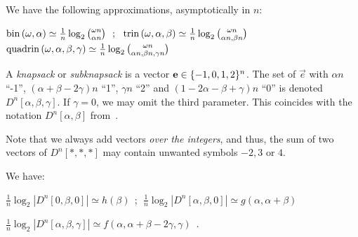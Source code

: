 \begin{property}%
 We have the following approximations, asymptotically in $n$:
\begin{center}$\mathrm{bin}\left(\omega,\alpha\right) \simeq \frac{1}{n} \log_2{\omega n \choose \alpha n} ~~;~~ \mathrm{trin}\left(\omega,\alpha,\beta\right) \simeq \frac{1}{n} \log_2{\omega n \choose \alpha n, \beta n} $ $ \mathrm{quadrin}\left(\omega,\alpha,\beta,\gamma\right) \simeq \frac{1}{n} \log_2 { \omega n \choose \alpha n, \beta n, \gamma n }$
\end{center}

\end{property}

% 

\begin{definition}
A \emph{knapsack} or \emph{subknapsack} is a vector $\mathbf{e} \in \{-1,0,1,2\}^n$. The set of $\vec{e}$ with $\alpha n$ ``-1'', $(\alpha + \beta - 2\gamma) n$ ``1'', $\gamma n$ ``2'' and $(1 - 2\alpha - \beta + \gamma)n$ ``0'' is denoted $D^n[\alpha, \beta, \gamma]$. 
If $\gamma = 0$, we may omit the third parameter. This coincides with the notation $D^n[\alpha, \beta]$ from~\cite{DBLP:conf/tqc/HelmM18}.
\end{definition}

Note that we always add vectors \emph{over the integers}, and thus, the sum of two vectors of $D^n[*,*,*]$ may contain unwanted symbols $-2, 3$ or $4$.

\begin{property}
\label{property:knapsack_size}
We have:
\begin{center}
$\frac{1}{n} \log_2 | D^n[0, \beta,0] | \simeq h(\beta) ~~; ~~\frac{1}{n} \log_2 | D^n[\alpha, \beta, 0] | \simeq  g(\alpha, \alpha + \beta)$
\vspace{1em}

$ \frac{1}{n} \log_2 | D^n[\alpha, \beta, \gamma] | \simeq f(\alpha, \alpha + \beta - 2\gamma, \gamma) \enspace. $
\end{center}



\end{property}


